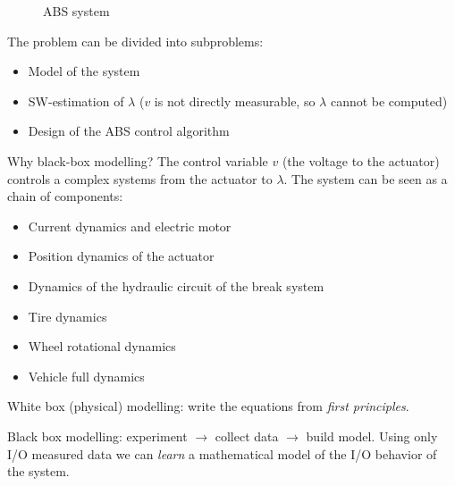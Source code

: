 \begin{figure}[H]
    \centering
    \caption*{ABS system}
\end{figure}

The problem can be divided into subproblems:
\begin{itemize}
    \item Model of the system
    \item SW-estimation of $\lambda$ ($v$ is not directly measurable, so $\lambda$ cannot be computed)
    \item Design of the ABS control algorithm
\end{itemize}

Why black-box modelling?
The control variable $v$ (the voltage to the actuator) controls a complex systems from the actuator to $\lambda$.
The system can be seen as a chain of components:
\begin{itemize}
    \item Current dynamics and electric motor
    \item Position dynamics of the actuator
    \item Dynamics of the hydraulic circuit of the break system
    \item Tire dynamics
    \item Wheel rotational dynamics
    \item Vehicle full dynamics
\end{itemize}

White box (physical) modelling: write the equations from \emph{first principles}.

Black box modelling: experiment $\rightarrow$ collect data $\rightarrow$ build model.
Using only I/O measured data we can \emph{learn} a mathematical model of the I/O behavior of the system.

